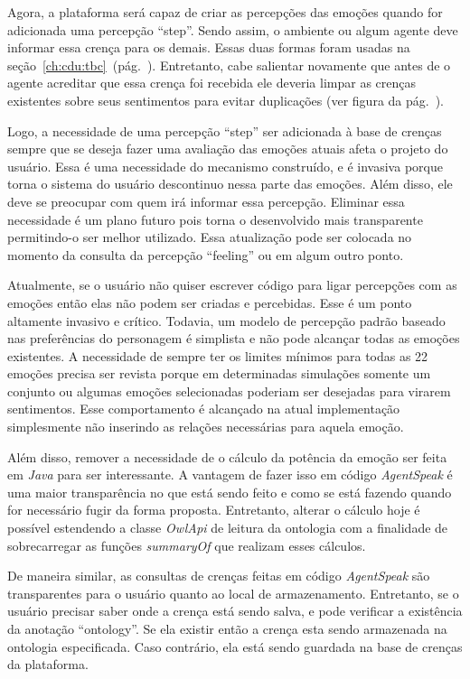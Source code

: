 Agora, a plataforma \jason será capaz de criar as percepções das emoções
quando for adicionada uma percepção ``step''. Sendo assim, o ambiente ou algum
agente deve informar essa crença para os demais.  Essas duas formas foram
usadas na seção~\ref{ch:cdu:tbc}~(pág.~\pageref{ch:cdu:tbc}). Entretanto, cabe
salientar novamente que antes de o agente acreditar que essa crença foi
recebida ele deveria limpar as crenças existentes sobre seus sentimentos para
evitar duplicações (ver figura da pág.~\pageref{fig:testeJasonIntBase}).

Logo, a necessidade de uma percepção ``step'' ser adicionada à base de crenças
sempre que se deseja fazer uma avaliação das emoções atuais afeta o projeto do
usuário. Essa é uma necessidade do mecanismo construído, e é invasiva porque torna
o sistema do usuário descontinuo nessa parte das emoções. Além disso, ele deve
se preocupar com quem irá informar essa percepção. Eliminar essa necessidade é
um plano futuro pois torna o desenvolvido mais transparente permitindo-o ser
melhor utilizado. Essa atualização pode ser colocada no momento da consulta da
percepção ``feeling'' ou em algum outro ponto.

Atualmente, se o usuário não quiser escrever código para ligar percepções com as
emoções então elas não podem ser criadas e percebidas. Esse é um ponto
altamente invasivo e crítico. %
Todavia, um modelo de percepção padrão baseado nas preferências do personagem
é simplista e não pode alcançar todas as emoções existentes. A necessidade de
sempre ter os limites mínimos para todas as 22 emoções precisa ser revista
porque em determinadas simulações somente um conjunto ou algumas emoções
selecionadas poderiam ser desejadas para virarem sentimentos. Esse
comportamento é alcançado na atual implementação simplesmente não inserindo as
relações necessárias para aquela emoção.

Além disso, remover a necessidade de o cálculo da potência da emoção ser feita
em \emph{Java} para ser interessante. A vantagem de fazer isso em código
\emph{AgentSpeak} é uma maior transparência no que está sendo feito e como se
está fazendo quando for necessário fugir da forma proposta. Entretanto,
alterar o cálculo hoje é possível estendendo a classe \emph{OwlApi} de leitura
da ontologia com a finalidade de sobrecarregar as funções \emph{summaryOf} que
realizam esses cálculos.

De maneira similar, as consultas de crenças feitas em código \emph{AgentSpeak}
são transparentes para o usuário quanto ao local de armazenamento. Entretanto,
se o usuário precisar saber onde a crença está sendo salva, e pode verificar
a existência da anotação ``ontology''. Se ela existir então a crença esta
sendo armazenada na ontologia especificada. Caso contrário, ela está sendo
guardada na base de crenças da plataforma.

